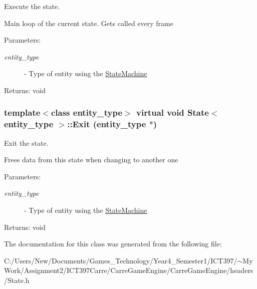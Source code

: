 Execute the state. 

Main loop of the current state. Gets called every frame

\begin{Desc}
\item[Parameters:]
\begin{description}
\item[{\em entity\_\-type}]- Type of entity using the \hyperlink{class_state_machine}{StateMachine}\end{description}
\end{Desc}
\begin{Desc}
\item[Returns:]void \end{Desc}
\hypertarget{class_state_1dc07d3a42d904b7e954fcfa3d27f23f}{
\subsubsection[Exit]{\setlength{\rightskip}{0pt plus 5cm}template$<$class entity\_\-type$>$ virtual void {\bf State}$<$ entity\_\-type $>$::Exit (entity\_\-type $\ast$)}}
\label{class_state_1dc07d3a42d904b7e954fcfa3d27f23f}


Exit the state. 

Frees data from this state when changing to another one

\begin{Desc}
\item[Parameters:]
\begin{description}
\item[{\em entity\_\-type}]- Type of entity using the \hyperlink{class_state_machine}{StateMachine}\end{description}
\end{Desc}
\begin{Desc}
\item[Returns:]void \end{Desc}


The documentation for this class was generated from the following file:\begin{CompactItemize}
\item 
C:/Users/New/Documents/Games\_\-Technology/Year4\_\-Semester1/ICT397/$\sim$My Work/Assignment2/ICT397Carre/CarreGameEngine/CarreGameEngine/headers/State.h\end{CompactItemize}
